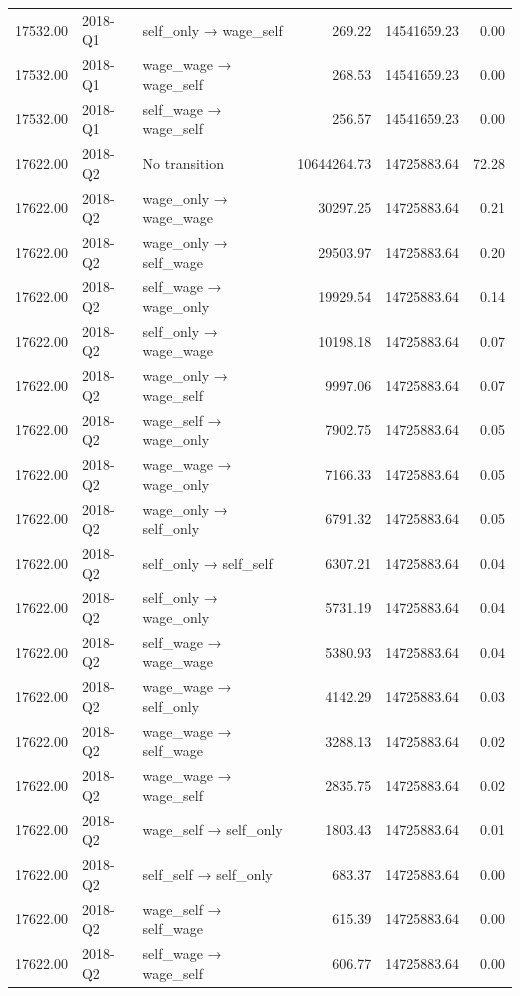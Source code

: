 \begin{table}[ht]
{\begin{tabular}{rllrrr}
  17532.00 & 2018-Q1 & self\_only → wage\_self & 269.22 & 14541659.23 & 0.00 \\ 
  17532.00 & 2018-Q1 & wage\_wage → wage\_self & 268.53 & 14541659.23 & 0.00 \\ 
  17532.00 & 2018-Q1 & self\_wage → wage\_self & 256.57 & 14541659.23 & 0.00 \\ 
  17622.00 & 2018-Q2 & No transition & 10644264.73 & 14725883.64 & 72.28 \\ 
  17622.00 & 2018-Q2 & wage\_only → wage\_wage & 30297.25 & 14725883.64 & 0.21 \\ 
  17622.00 & 2018-Q2 & wage\_only → self\_wage & 29503.97 & 14725883.64 & 0.20 \\ 
  17622.00 & 2018-Q2 & self\_wage → wage\_only & 19929.54 & 14725883.64 & 0.14 \\ 
  17622.00 & 2018-Q2 & self\_only → wage\_wage & 10198.18 & 14725883.64 & 0.07 \\ 
  17622.00 & 2018-Q2 & wage\_only → wage\_self & 9997.06 & 14725883.64 & 0.07 \\ 
  17622.00 & 2018-Q2 & wage\_self → wage\_only & 7902.75 & 14725883.64 & 0.05 \\ 
  17622.00 & 2018-Q2 & wage\_wage → wage\_only & 7166.33 & 14725883.64 & 0.05 \\ 
  17622.00 & 2018-Q2 & wage\_only → self\_only & 6791.32 & 14725883.64 & 0.05 \\ 
  17622.00 & 2018-Q2 & self\_only → self\_self & 6307.21 & 14725883.64 & 0.04 \\ 
  17622.00 & 2018-Q2 & self\_only → wage\_only & 5731.19 & 14725883.64 & 0.04 \\ 
  17622.00 & 2018-Q2 & self\_wage → wage\_wage & 5380.93 & 14725883.64 & 0.04 \\ 
  17622.00 & 2018-Q2 & wage\_wage → self\_only & 4142.29 & 14725883.64 & 0.03 \\ 
  17622.00 & 2018-Q2 & wage\_wage → self\_wage & 3288.13 & 14725883.64 & 0.02 \\ 
  17622.00 & 2018-Q2 & wage\_wage → wage\_self & 2835.75 & 14725883.64 & 0.02 \\ 
  17622.00 & 2018-Q2 & wage\_self → self\_only & 1803.43 & 14725883.64 & 0.01 \\ 
  17622.00 & 2018-Q2 & self\_self → self\_only & 683.37 & 14725883.64 & 0.00 \\ 
  17622.00 & 2018-Q2 & wage\_self → self\_wage & 615.39 & 14725883.64 & 0.00 \\ 
  17622.00 & 2018-Q2 & self\_wage → wage\_self & 606.77 & 14725883.64 & 0.00 \\ 

\end{tabular}}
\end{table}
